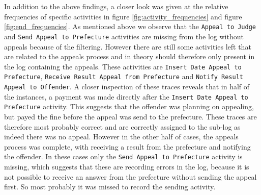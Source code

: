 \documentclass[12pt]{report}
\begin{document}
In addition to the above findings, a closer look was given at the relative frequencies of specific activities in figure \ref{fig:activity_frequencies} and figure \ref{fig:end_frequencies}. As mentioned above we observe that the \texttt{Appeal to Judge} and \texttt{Send Appeal to Prefecture} activities are missing from the log without appeals because of the filtering. However there are still some activities left that are related to the appeals process and in theory should therefore only present in the log containing the appeals. These activities are \texttt{Insert Date Appeal to Prefecture}, \texttt{Receive Result Appeal from Prefecture} and \texttt{Notify Result Appeal to Offender}. A closer inspection of these traces reveals that in half of the instances, a payment was made directly after the \texttt{Insert Date Appeal to Prefecture} activity. This suggests that the offender was planning on appealing, but payed the fine before the appeal was send to the prefecture. These traces are therefore most probably correct and are correctly assigned to the sub-log as indeed there was no appeal.  However in the other half of cases, the appeals process was complete, with receiving a result from the prefecture and notifying the offender. In these cases only the \texttt{Send Appeal to Prefecture} activity is missing, which suggests that these are recording errors in the log, because it is not possible to receive an answer from the prefecture without sending the appeal first. So most probably it was missed to record the sending activity.
\end{document}
